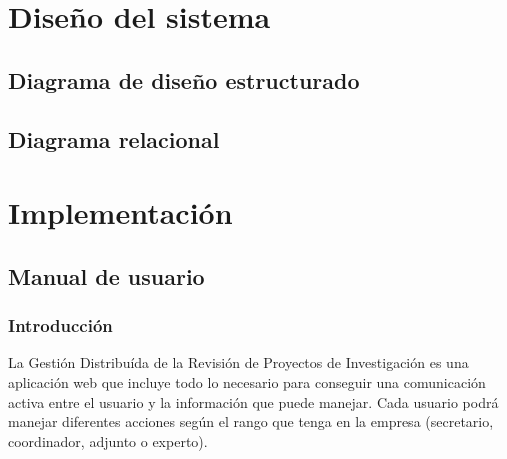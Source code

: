 \documentclass[12pt,a4paper,spanish,twoside]{book}
\begin{document}
\part{Diseño del sistema}
\chapter{Diagrama de diseño estructurado}

\begin{sidewaystable}
\end{sidewaystable}

\begin{sidewaystable}
\end{sidewaystable}

\begin{sidewaystable}
\end{sidewaystable}

\begin{sidewaystable}
\end{sidewaystable}

\begin{sidewaystable}
\end{sidewaystable}

\begin{sidewaystable}
\end{sidewaystable}

\chapter{Diagrama relacional}
\newpage
{}

\part{Implementación}
\chapter{Manual de usuario}
\section{Introducción}
La Gestión Distribuída de la Revisión de Proyectos de Investigación es una
aplicación web que incluye todo lo necesario para conseguir una comunicación 
activa entre el usuario y la información que puede manejar. Cada usuario podrá 
manejar diferentes acciones según el rango que tenga en la empresa (secretario,
coordinador, adjunto o experto).
\end{document}
